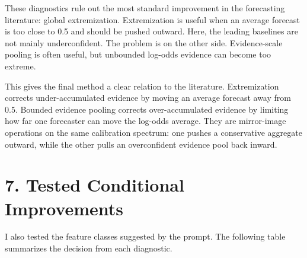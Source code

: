\documentclass[
]{article}
\begin{document}
These diagnostics rule out the most standard improvement in the
forecasting literature: global extremization. Extremization is useful
when an average forecast is too close to 0.5 and should be pushed
outward. Here, the leading baselines are not mainly underconfident. The
problem is on the other side. Evidence-scale pooling is often useful,
but unbounded log-odds evidence can become too extreme.

This gives the final method a clear relation to the literature.
Extremization corrects under-accumulated evidence by moving an average
forecast away from 0.5. Bounded evidence pooling corrects
over-accumulated evidence by limiting how far one forecaster can move
the log-odds average. They are mirror-image operations on the same
calibration spectrum: one pushes a conservative aggregate outward, while
the other pulls an overconfident evidence pool back inward.

\section{7. Tested Conditional
Improvements}\label{tested-conditional-improvements}

I also tested the feature classes suggested by the prompt. The following
table summarizes the decision from each diagnostic.
\end{document}

